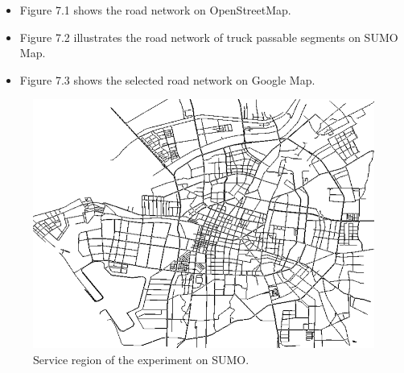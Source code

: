 \documentclass[12pt]{ksthesis}
\begin{document}
\begin{thesis}
{\begin{itemize}
\item
Figure 7.1 shows the road network on OpenStreetMap.

\item
Figure 7.2 illustrates the road network of truck passable segments on SUMO Map.

\item
Figure 7.3 shows the selected road network on Google Map.

\end{itemize}

\begin{figure}[H]
\centering
\includegraphics[width=1.0\textwidth]{./Thesis_figures/F7-2_SUMOMap.PNG}
\caption{\large  Service region of the experiment on SUMO.}
\vspace{0.5cm}
\label{Fig:SUMOMap}
\end{figure}

}
\end{thesis}
\end{document}
